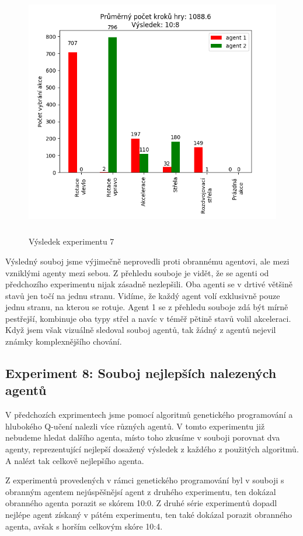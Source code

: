 \begin{figure}[H]\centering
\includegraphics[width=145mm, height=110mm]{./Obrazky/Experiment07Results.png}
\caption{Výsledek experimentu 7}
\label{Výsledek experimentu 07}
\end{figure}


Výsledný souboj jsme výjimečně neprovedli proti obrannému agentovi, ale mezi vzniklými agenty mezi sebou.
Z přehledu souboje je vidět, že se agenti od předchozího experimentu nijak zásadně nezlepšili. Oba agenti se v drtivé většině stavů jen točí na jednu stranu.
Vidíme, že každý agent volí exklusivně pouze jednu stranu, na kterou se rotuje. 
Agent 1 se z přehledu souboje zdá být mírně pestřejší, kombinuje oba typy střel a navíc v téměř pětině stavů volil akceleraci.
Když jsem však vizuálně sledoval souboj agentů, tak žádný z agentů nejevil známky komplexnějšího chování. 


\subsection{Experiment 8: Souboj nejlepších nalezených agentů}
V předchozích exprimentech jsme pomocí algoritmů genetického programování a hlubokého Q-učení nalezli více různých agentů. 
V tomto experimentu již nebudeme hledat dalšího agenta, místo toho zkusíme v souboji porovnat dva agenty, reprezentující nejlepší dosažený výsledek z každého z použitých algoritmů.
A nalézt tak celkově nejlepšího agenta.
\par
Z experimentů provedených v rámci genetického programování byl v souboji s obranným agentem nejúspěšnějsí agent z druhého experimentu, ten dokázal obranného agenta porazit se skórem 10:0.
Z druhé série experimentů dopadl nejlépe agent získaný v pátém experimentu, ten také dokázal porazit obranného agenta, avšak s horším celkovým skóre 10:4.

